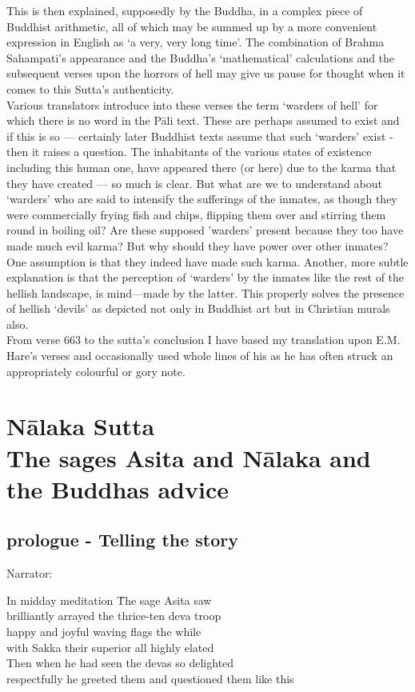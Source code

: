This is then explained, supposedly by the Buddha, in a complex piece of Buddhist arithmetic, all of which may be summed up by a more convenient expression in English as `a very, very long time'. The combination of Brahma Sahampati's appearance and the Buddha's `mathematical' calculations and the subsequent verses upon the horrors of hell may give us pause for thought when it comes to this Sutta's authenticity.\\

Various translators introduce into these verses the term `warders of hell' for which there is no word in the P\=ali text. These are perhaps assumed to exist and if this is so — certainly later Buddhist texts assume that such `warders' exist - then it raises a question. The inhabitants of the various states of existence including this human one, have appeared there (or here) due to the karma that they have created — so much is clear. But what are we to understand about `warders' who are said to intensify the sufferings of the inmates, as though they were commercially frying fish and chips, flipping them over and stirring them round in boiling oil? Are these supposed 'warders' present because they too have made much evil karma? But why should they have power over other inmates? One assumption is that they indeed have made such karma. Another, more subtle explanation is that the perception of `warders' by the inmates like the rest of the hellish landscape, is mind—made by the latter. This properly solves the presence of hellish `devils' as depicted not only in Buddhist art but in Christian murals also.\\

From verse 663 to the sutta's conclusion I have based my translation upon E.M. Hare's verses and occasionally used whole lines of his as he has often struck an appropriately colourful or gory note.

\chapter{N\=alaka Sutta\\ The sages Asita and N\=alaka and the  Buddhas advice}

\section{prologue - Telling the story}

\begin{MyDescription}[]{Narrator:}
\end{MyDescription}
\begin{tabbing}
In midday meditation \hspace{1.5cm} \=      The sage Asita saw\\
brilliantly arrayed \> the thrice-ten deva troop\\
happy and joyful \> waving flags the while\\
with Sakka their superior \> all highly elated\\
Then when he had seen \> the devas so delighted\\
respectfully he greeted them \> and questioned them like this\\
\end{tabbing}


